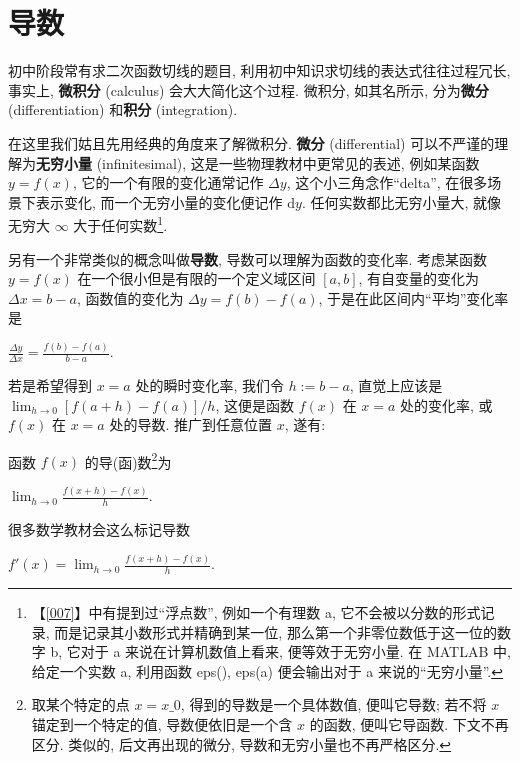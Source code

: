\section{导数}\label{012}

初中阶段常有求二次函数切线的题目,
利用初中知识求切线的表达式往往过程冗长, 事实上, \textbf{微积分}
(calculus) 会大大简化这个过程. 微积分, 如其名所示, 分为\textbf{微分}
(differentiation) 和\textbf{积分 }(integration).

在这里我们姑且先用经典的角度来了解微积分. \textbf{微分} (differential)
可以不严谨的理解为\textbf{无穷小量} (infinitesimal),
这是一些物理教材中更常见的表述, 例如某函数 $y=f(x)$,
它的一个有限的变化通常记作 $\Delta y$, 这个小三角念作``delta'',
在很多场景下表示变化, 而一个无穷小量的变化便记作 $\mathrm{d}y$.
任何实数都比无穷小量大, 就像无穷大 $\infty$ 大于任何实数\footnote{【\ref{007}】中有提到过``浮点数'', 例如一个有理数 a,
它不会被以分数的形式记录, 而是记录其小数形式并精确到某一位,
那么第一个非零位数低于这一位的数字 b, 它对于 a 来说在计算机数值上看来,
便等效于无穷小量. 在 MATLAB 中, 给定一个实数 a, 利用函数 eps(), eps(a)
便会输出对于 a 来说的``无穷小量''.}.

另有一个非常类似的概念叫做\textbf{导数}, 导数可以理解为函数的变化率.
考虑某函数 $y=f(x)$ 在一个很小但是有限的一个定义域区间 $[a,b]$,
有自变量的变化为 $\Delta x=b-a$, 函数值的变化为
$\Delta y= f(b)-f(a)$, 于是在此区间内``平均''变化率是

$\frac{\Delta y}{\Delta x}=\frac{f(b)-f(a)}{b-a}.$

若是希望得到 $x=a$ 处的瞬时变化率, 我们令 $h:=b-a$, 直觉上应该是
$\lim_{h\rightarrow0}[f(a+h)-f(a)]/h$, 这便是函数 $f(x)$ 在 $x=a$
处的变化率, 或 $f(x)$ 在 $x=a$ 处的导数. 推广到任意位置 $x$, 遂有:

\begin{tcolorbox}[size=fbox, breakable, enhanced jigsaw, title={定义}]
函数 $f(x)$ 的导(函)数\footnote{取某个特定的点 $x=x\_0$,
  得到的导数是一个具体数值, 便叫它导数; 若不将 $x$ 锚定到一个特定的值,
  导数便依旧是一个含 $x$ 的函数, 便叫它导函数. 下文不再区分. 类似的,
  后文再出现的微分, 导数和无穷小量也不再严格区分.}为

$\lim_{h\rightarrow0}\frac{f(x+h)-f(x)}{h}.$
\end{tcolorbox}

很多数学教材会这么标记导数

$\boxed{f'(x)=\lim_{h\rightarrow0}\frac{f(x+h)-f(x)}{h}}.$

